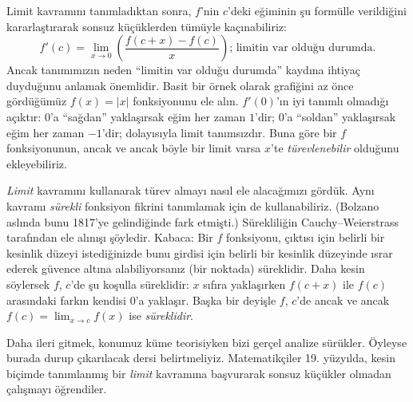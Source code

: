 Limit kavramını tanımladıktan sonra, $f$'nin $c$'deki eğiminin şu formülle
verildiğini kararlaştırarak sonsuz küçüklerden tümüyle kaçınabiliriz:
\[
	{f}'(c) = \lim_{x \rightarrow 0}\left(\frac{f(c +x) - f(c)}{x}\right) \text{; limitin var olduğu durumda.}
\]
Ancak tanımımızın neden ``limitin var olduğu durumda'' kaydına ihtiyaç
duyduğunu anlamak önemlidir. Basit bir örnek olarak grafiğini az önce
gördüğümüz $f(x) = |x|$ fonksiyonunu ele alın. $f'(0)$'ın iyi tanımlı
olmadığı açıktır: $0$'a ``sağdan'' yaklaşırsak eğim her zaman $1$'dir;
$0$'a ``soldan'' yaklaşırsak eğim her zaman $-1$'dir; dolayısıyla limit
tanımsızdır. Buna göre bir $f$ fonksiyonunun, ancak ve ancak böyle bir limit
varsa $x$'te \emph{türevlenebilir} olduğunu ekleyebiliriz.

\emph{Limit} kavramını kullanarak türev almayı nasıl ele alacağımızı gördük.
Aynı kavramı \emph{sürekli} fonksiyon fikrini tanımlamak için de
kullanabiliriz. (Bolzano aslında bunu 1817'ye gelindiğinde fark etmişti.)
Sürekliliğin Cauchy--Weierstrass tarafından ele alınışı şöyledir. Kabaca: Bir
$f$ fonksiyonu, çıktısı için belirli bir kesinlik düzeyi istediğinizde bunu
girdisi için belirli bir kesinlik düzeyinde ısrar ederek güvence altına
alabiliyorsanız (bir noktada) süreklidir. Daha kesin söylersek $f$, $c$'de şu
koşulla süreklidir: $x$ sıfıra yaklaşırken $f(c + x)$ ile $f(c)$ arasındaki
farkın kendisi $0$'a yaklaşır. Başka bir deyişle $f$, $c$'de ancak ve ancak
$f(c) = \lim_{x \rightarrow c} f(x)$ ise \emph{süreklidir}.

Daha ileri gitmek, konumuz küme teorisiyken bizi gerçel analize sürükler.
Öyleyse burada durup çıkarılacak dersi belirtmeliyiz. Matematikçiler 19.
yüzyılda, kesin biçimde tanımlanmış bir \emph{limit} kavramına başvurarak
sonsuz küçükler olmadan çalışmayı öğrendiler.

